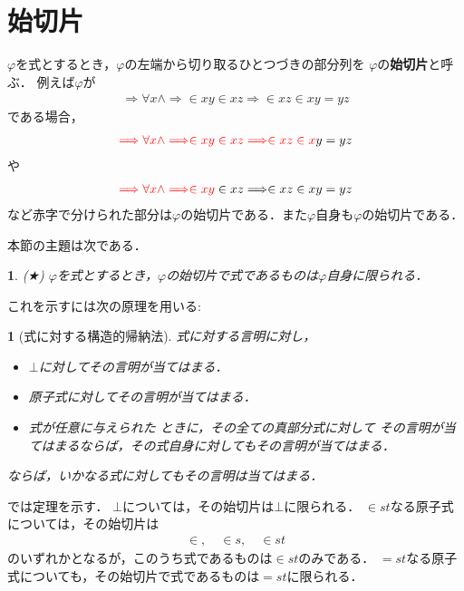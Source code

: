 \documentclass[a4j,10.5pt,oneside,openany]{jsbook}
\theoremstyle{mystyle}
\newtheorem{metaaxm}[thm]{\color{Mahogany}{メタ公理}}
\newtheorem{metathm}[thm]{\color{DarkMidnightBlue}{メタ定理}}
\begin{document}
\section{始切片}
	$\varphi$を式とするとき，$\varphi$の左端から切り取るひとつづきの部分列を
	$\varphi$の{\bf 始切片}と呼ぶ．
	例えば$\varphi$が
	\begin{align}
		\Longrightarrow \forall x \wedge \Longrightarrow \in xy \in xz \Longrightarrow \in xz \in xy = yz
	\end{align}
	である場合，
	\begin{align}
		\textcolor{red}{\Longrightarrow \forall x \wedge \Longrightarrow \in xy \in xz \Longrightarrow \in xz \in x}y = yz
	\end{align}
	や
	\begin{align}
		\textcolor{red}{\Longrightarrow \forall x \wedge \Longrightarrow \in xy} \in xz \Longrightarrow \in xz \in xy = yz
	\end{align}
	など赤字で分けられた部分は$\varphi$の始切片である．また$\varphi$自身も$\varphi$の始切片である．
	
	本節の主題は次である．
	\begin{screen}
		\begin{metathm}
			(★) $\varphi$を式とするとき，$\varphi$の始切片で式であるものは$\varphi$自身に限られる．
		\end{metathm}
	\end{screen}
	
	これを示すには次の原理を用いる:
	\begin{screen}
		\begin{metaaxm}[式に対する構造的帰納法]
			式に対する言明に対し，
			\begin{itemize}
				\item $\bot$に対してその言明が当てはまる．
				\item 原子式に対してその言明が当てはまる．
				\item 式が任意に与えられた\footnotemark
					ときに，その全ての真部分式に対して
					その言明が当てはまるならば，その式自身に対してもその言明が当てはまる．
			\end{itemize}
			ならば，いかなる式に対してもその言明は当てはまる．
		\end{metaaxm}
	\end{screen}
	
	
	では定理を示す．
	$\bot$については，その始切片は$\bot$に限られる．
	$\in st$なる原子式については，その始切片は
	\begin{align}
		\in, \quad \in s, \quad \in st
	\end{align}
	のいずれかとなるが，このうち式であるものは$\in st$のみである．
	$=st$なる原子式についても，その始切片で式であるものは$=st$に限られる．
	
\end{document}
